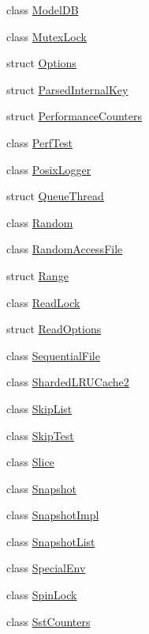 \begin{DoxyCompactItemize}
class \hyperlink{classleveldb_1_1_model_d_b}{Model\+D\+B}
\item 
class \hyperlink{classleveldb_1_1_mutex_lock}{Mutex\+Lock}
\item 
struct \hyperlink{structleveldb_1_1_options}{Options}
\item 
struct \hyperlink{structleveldb_1_1_parsed_internal_key}{Parsed\+Internal\+Key}
\item 
struct \hyperlink{structleveldb_1_1_performance_counters}{Performance\+Counters}
\item 
class \hyperlink{classleveldb_1_1_perf_test}{Perf\+Test}
\item 
class \hyperlink{classleveldb_1_1_posix_logger}{Posix\+Logger}
\item 
struct \hyperlink{structleveldb_1_1_queue_thread}{Queue\+Thread}
\item 
class \hyperlink{classleveldb_1_1_random}{Random}
\item 
class \hyperlink{classleveldb_1_1_random_access_file}{Random\+Access\+File}
\item 
struct \hyperlink{structleveldb_1_1_range}{Range}
\item 
class \hyperlink{classleveldb_1_1_read_lock}{Read\+Lock}
\item 
struct \hyperlink{structleveldb_1_1_read_options}{Read\+Options}
\item 
class \hyperlink{classleveldb_1_1_sequential_file}{Sequential\+File}
\item 
class \hyperlink{classleveldb_1_1_sharded_l_r_u_cache2}{Sharded\+L\+R\+U\+Cache2}
\item 
class \hyperlink{classleveldb_1_1_skip_list}{Skip\+List}
\item 
class \hyperlink{classleveldb_1_1_skip_test}{Skip\+Test}
\item 
class \hyperlink{classleveldb_1_1_slice}{Slice}
\item 
class \hyperlink{classleveldb_1_1_snapshot}{Snapshot}
\item 
class \hyperlink{classleveldb_1_1_snapshot_impl}{Snapshot\+Impl}
\item 
class \hyperlink{classleveldb_1_1_snapshot_list}{Snapshot\+List}
\item 
class \hyperlink{classleveldb_1_1_special_env}{Special\+Env}
\item 
class \hyperlink{classleveldb_1_1_spin_lock}{Spin\+Lock}
\item 
class \hyperlink{classleveldb_1_1_sst_counters}{Sst\+Counters}
\item 

\end{DoxyCompactItemize}
